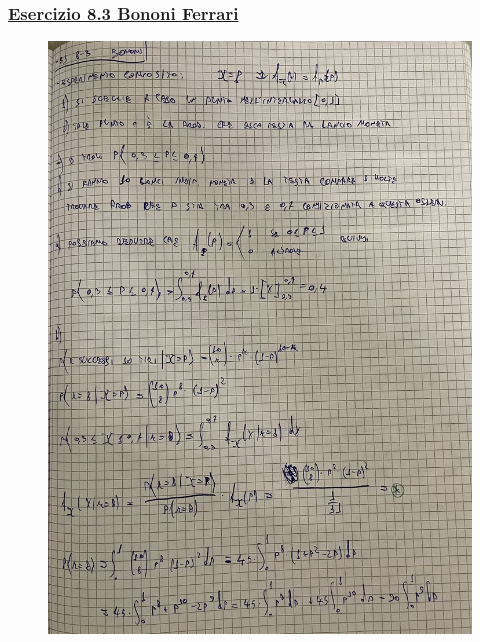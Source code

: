 \documentclass{article}
\begin{document}
\subsubsection{\underline{Esercizio 8.3 Bononi Ferrari}}
\begin{figure}[ht]
\centering
\includegraphics[scale=0.10]{ese/41.jpeg}
\end{figure}
\end{document}
